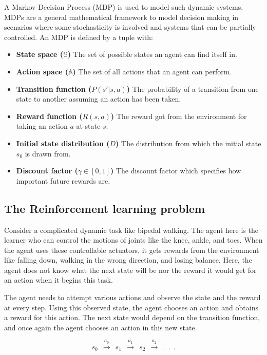 \documentclass[hidelinks,BTech]{iitmdiss}
\begin{document}
A Markov Decision Process \cite{MarkovDecisionProcess} (MDP) is used to model such dynamic systems. MDPs are a general mathematical framework to model decision making in scenarios where some stochasticity is involved and systems that can be partially controlled. An MDP is defined by a tuple with:
\begin{itemize}
\item{{\bf State space ($\mathbb{S}$)} The set of possible states an agent can find itself in.}
\item{{\bf Action space ($\mathbb{A}$)} The set of all actions that an agent can perform.}
\item{{\bf Transition function ($P(s'|s,a)$)} The probability of a transition from one state to another assuming an action has been taken.}
\item{{\bf Reward function ($R(s, a)$)} The reward got from the environment for taking an action $a$ at state $s$.}
\item{{\bf Initial state distribution ($D$)} The distribution from which the initial state $s_0$ is drawn from.}
\item{{\bf Discount factor ($\gamma \in [0,1]$)} The discount factor which specifies how important future rewards are.}
\end{itemize}

\subsection{The Reinforcement learning problem}
Consider a complicated dynamic task like bipedal walking. The agent here is the learner who can control the motions of joints like the knee, ankle, and toes. When the agent uses these controllable actuators, it gets rewards from the environment like falling down, walking in the wrong direction, and losing balance. Here, the agent does not know what the next state will be nor the reward it would get for an action when it begins this task.

The agent needs to attempt various actions and observe the state and the reward at every step. Using this observed state, the agent chooses an action and obtains a reward for this action. The next state would depend on the transition function, and once again the agent chooses an action in this new state.

\begin{equation}
  s_0\ \ \xrightarrow{a_0}\ \ s_1\ \ \xrightarrow{a_1}\ \ s_2\ \ \xrightarrow{a_2}\ \ .\ \ .\ \ .
\end{equation}
\end{document}
